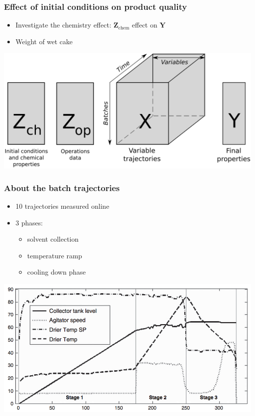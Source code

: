 \begin{frame}\frametitle{Effect of initial conditions on product quality}

\begin{itemize}
	\item	Investigate the chemistry effect: \( \mathbf{Z}_\text{chem}\) effect on \( \mathbf{Y}\)
	
	\item	Weight of wet cake
\end{itemize}

\begin{center}
	\includegraphics[width=\textwidth]{images/fmc/fmc-data-structure}
\end{center}

\end{frame}

\begin{frame}\frametitle{About the batch trajectories}

\begin{itemize}
	\item	10 trajectories measured online
	
	\item	3 phases:
	
	\begin{itemize}
		\item	solvent collection
		
		\item	temperature ramp
		
		\item	cooling down phase
	\end{itemize}
\end{itemize}
\begin{center}
	\includegraphics[width=\textwidth]{images/fmc/fmc-phases-4-trajectories.png}
\end{center}

\end{frame}

